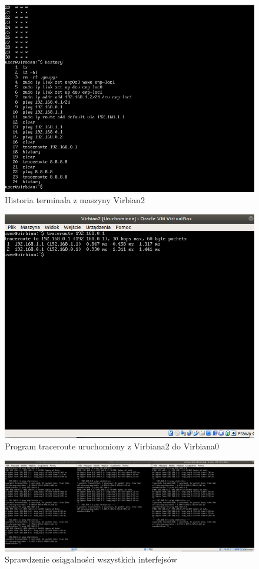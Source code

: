 \documentclass[a4paper]{scrartcl}
\begin{document}
\begin{figure}
  \includegraphics[width=\linewidth]{hw33.png}
  \caption{Historia terminala z maszyny Virbian2}
  \label{fig:hv3}
\end{figure}

\begin{figure}
  \includegraphics[width=\linewidth]{traceroute.png}
  \caption{Program traceroute uruchomiony z Virbiana2 do Virbiana0}
  \label{fig:tr}
\end{figure}

\begin{figure}
  \includegraphics[width=\linewidth]{pings.png}
  \caption{Sprawdzenie osiągalności wszystkich interfejsów}
  \label{fig:tr}
\end{figure}
\end{document}

